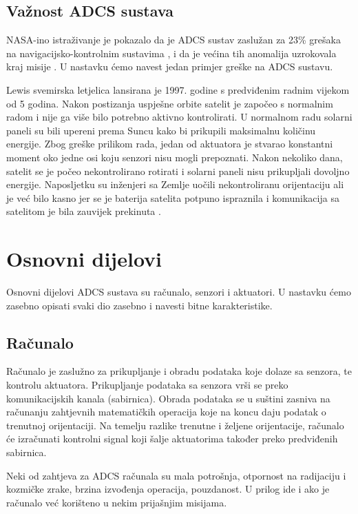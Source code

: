 \documentclass[times, utf8, diplomski, numeric]{templates/template}
\begin{document}
{{        \subsection{Važnost ADCS sustava}{
            NASA-ino istraživanje je pokazalo da je ADCS sustav zaslužan za 23\% grešaka na navigacijsko-kontrolnim sustavima , i da je većina tih anomalija uzrokovala kraj misije \cite{greskeNaAdcsPostotak}. U nastavku ćemo navest jedan primjer greške na ADCS sustavu.
    
            Lewis svemirska letjelica \cite{lewis} lansirana je 1997. godine s predviđenim radnim vijekom od 5 godina. Nakon postizanja uspješne orbite satelit je započeo s normalnim radom i nije ga više bilo potrebno aktivno kontrolirati. U normalnom radu solarni paneli su bili upereni prema Suncu kako bi prikupili maksimalnu količinu energije. Zbog greške prilikom rada, jedan od aktuatora je stvarao konstantni moment oko jedne osi koju senzori nisu mogli prepoznati. Nakon nekoliko dana, satelit se je počeo nekontrolirano rotirati i solarni paneli nisu prikupljali dovoljno energije. Naposljetku su inženjeri sa Zemlje uočili nekontroliranu orijentaciju ali je već bilo kasno jer se je baterija satelita potpuno ispraznila i komunikacija sa satelitom je bila zauvijek prekinuta \cite{greskeNaAdcsSlucajevi}.
        }
    }

    \section{Osnovni dijelovi}{
        Osnovni dijelovi ADCS sustava su računalo, senzori i aktuatori. U nastavku ćemo zasebno opisati svaki dio zasebno i navesti bitne karakteristike.
 
        \subsection{Računalo}{
            Računalo je zaslužno za prikupljanje i obradu podataka koje dolaze sa senzora, te kontrolu aktuatora. Prikupljanje podataka sa senzora vrši se preko komunikacijskih kanala (sabirnica). Obrada podataka se u suštini zasniva na računanju zahtjevnih matematičkih operacija koje na koncu daju podatak o trenutnoj orijentaciji. Na temelju razlike trenutne i željene orijentacije, računalo će izračunati kontrolni signal koji šalje aktuatorima također preko predviđenih sabirnica. 

            Neki od zahtjeva za ADCS računala su mala potrošnja, otpornost na radijaciju i kozmičke zrake, brzina izvođenja operacija, pouzdanost. U prilog ide i ako je računalo već korišteno u nekim prijašnjim misijama.
        }

}}
\end{document}
